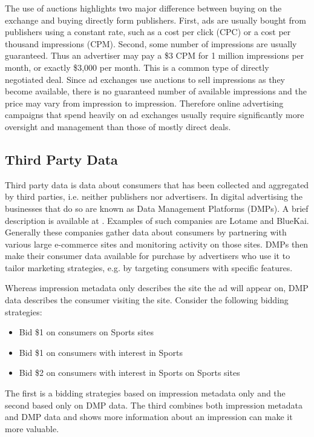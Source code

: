 \documentclass{article}
\begin{document}
The use of auctions highlights two major difference between buying on the exchange and buying directly form publishers. First, ads are usually bought from publishers using a constant rate, such as a cost per click (CPC) or a cost per thousand impressions (CPM). Second, some number of impressions are usually guaranteed. Thus an advertiser may pay a \$3 CPM for 1 million impressions per month, or exactly \$3,000 per month. This is a common type of directly negotiated deal. Since ad exchanges use auctions to sell impressions as they become available, there is no guaranteed number of available impressions and the price may vary from impression to impression. Therefore online advertising campaigns that spend heavily on ad exchanges usually require significantly more oversight and management than those of mostly direct deals.

\subsection{Third Party Data}

Third party data is data about consumers that has been collected and aggregated by third parties, i.e. neither publishers nor advertisers. In digital advertising the businesses that do so are known as Data Management Platforms (DMPs). A brief description is available at \cite{iab1}. Examples of such companies are Lotame and  BlueKai. Generally these companies gather data about consumers by partnering with various large e-commerce sites and monitoring activity on those sites. DMPs then make their consumer data available for purchase by advertisers who use it to tailor marketing strategies, e.g. by targeting consumers with specific features.

Whereas impression metadata only describes the site the ad will appear on, DMP data describes the consumer visiting the site. Consider the following bidding strategies:

\begin{itemize}
\item Bid \$1 on consumers on Sports sites
\item Bid \$1 on consumers with interest in Sports
\item Bid \$2 on consumers with interest in Sports on Sports sites
\end{itemize}

The first is a bidding strategies based on impression metadata only and the second based only on DMP data. The third combines both impression metadata and DMP data and shows more information about an impression can make it more valuable.
\end{document}
